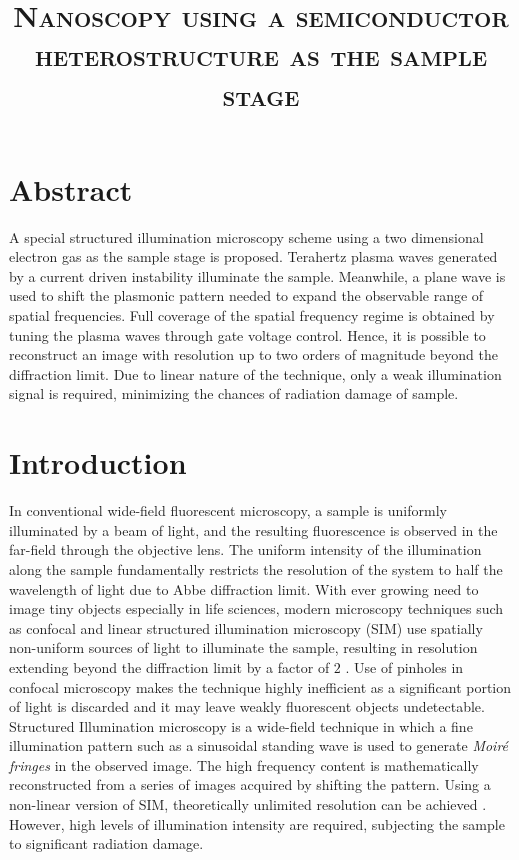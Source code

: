 \documentclass[11pt]{article}
\begin{document}
\title{\textsc{ Nanoscopy using a semiconductor heterostructure as the sample stage}}

\maketitle


\section{Abstract}
%
A special structured illumination microscopy scheme using a two dimensional electron gas as the sample stage is proposed. Terahertz plasma waves generated by a current driven instability illuminate the sample. Meanwhile, a plane wave is used to shift the plasmonic pattern needed to expand the observable range of spatial frequencies. Full coverage of the spatial frequency regime is obtained by tuning the plasma waves through gate voltage control. Hence, it is possible to reconstruct an image with resolution up to two orders of magnitude beyond the diffraction limit. Due to linear nature of the technique, only a weak illumination signal is required, minimizing the chances of radiation damage of sample.
%
\section{Introduction}
%
In conventional wide-field fluorescent microscopy, a sample is uniformly illuminated by a beam of light, and the resulting fluorescence is observed in the far-field through the objective lens. The uniform intensity of the illumination along the sample fundamentally restricts the resolution of the system to half the wavelength of light due to Abbe diffraction limit. With ever growing need to image tiny objects especially in life sciences, modern microscopy techniques such as confocal and linear structured illumination microscopy (SIM) use spatially non-uniform sources of light to illuminate the sample, resulting in resolution extending beyond the diffraction limit by a factor of $2$ \cite{Minsky1988,Gustafsson2000}. Use of pinholes in confocal microscopy makes the technique highly inefficient as a significant portion of light is discarded and it may leave weakly fluorescent objects undetectable. Structured Illumination microscopy is a wide-field technique in which a fine illumination pattern such as a sinusoidal standing wave is used to generate \emph{Moiré fringes} in the observed image. The high frequency content is mathematically reconstructed from a series of images acquired by shifting the pattern. Using a non-linear version of SIM, theoretically unlimited resolution can be achieved \cite{Gustafsson_2005}. However, high levels of illumination intensity are required, subjecting the sample to significant radiation damage.
\end{document}
